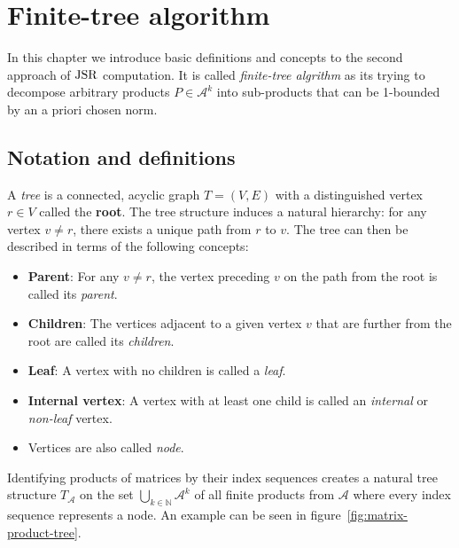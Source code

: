 
\chapter{Finite-tree algorithm}
\label{ch:finite-tree}
In this chapter we introduce basic definitions and concepts to the second approach of $\operatorname{JSR}$ computation. It is called \emph{finite-tree algrithm} as its trying to decompose arbitrary products $P \in \mathcal{A}^k$ into sub-products that can be 1-bounded by an a priori chosen norm.  

\section{Notation and definitions}

\begin{definition}
    A \emph{tree} is a connected, acyclic graph \( T = (V, E) \) with a distinguished vertex \( r \in V \) called the \textbf{root}. The tree structure induces a natural hierarchy: for any vertex \( v \neq r \), there exists a unique path from \( r \) to \( v \). The tree can then be described in terms of the following concepts:
    \begin{itemize}
        \item \textbf{Parent}: For any \( v \neq r \), the vertex preceding \( v \) on the path from the root is called its \emph{parent}.
        \item \textbf{Children}: The vertices adjacent to a given vertex \( v \) that are further from the root are called its \emph{children}.
        \item \textbf{Leaf}: A vertex with no children is called a \emph{leaf}.
        \item \textbf{Internal vertex}: A vertex with at least one child is called an \emph{internal} or \emph{non-leaf} vertex.
        \item Vertices are also called \emph{node}.
    \end{itemize}
\end{definition}



Identifying products of matrices by their index sequences creates a natural tree structure $T_{\mathcal{A}}$ on the set $\bigcup_ {k \in \mathbb{N}}\mathcal{A}^k$ of all finite products from $\mathcal{A}$ where every index sequence represents a node. An example can be seen in figure~\ref{fig:matrix-product-tree}.

